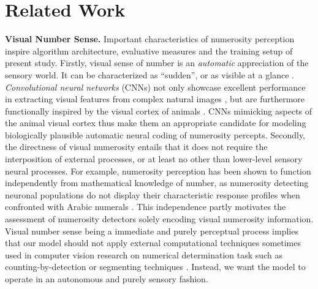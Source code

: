 \documentclass[twocolumn]{article}
\begin{document}
\hypertarget{related-work}{%
\section{Related Work}\label{related-work}}

\newcommand{\relatedss}[2]{{\bfseries #1. }{#2}}

\relatedss{Visual Number Sense}{Important characteristics of numerosity perception inspire algorithm architecture, evaluative measures and the  training setup of present study. Firstly, visual sense of number is an \emph{automatic} appreciation of the sensory world. It can be characterized as ``sudden'', or as visible at a glance \citetext{\citealp[p.~57]{dehaene2011number}; \citealp{zhang2016salient}}. \emph{Convolutional neural networks} (CNNs) not only showcase excellent performance in extracting visual features from complex natural images \citetext{\citealp{GoogleDeepMind}; \citealp{krizhevsky2012imagenet}; \citealp[for visual number sense and CNNs see][]{zhang2016salient}}, but are furthermore functionally inspired by the visual cortex of animals \citep[specifically cats, see][]{lecun1995convolutional}. CNNs mimicking aspects of the animal visual cortex thus make them an appropriate candidate for modeling biologically plausible automatic neural coding of numerosity percepts. 
Secondly, the directness of visual numerosity entails that it does not require the interposition of external processes, or at least no other than lower-level sensory neural processes. For example, numerosity perception has been shown to function independently from mathematical knowledge of number, as numerosity detecting neuronal populations do not display their characteristic response profiles when confronted with Arabic numerals \citep{harvey2013topographic, poncet2016individuation}. This independence partly motivates the assessment of numerosity detectors solely encoding visual numerosity information. Visual number sense being a immediate and purely perceptual process implies that our model should not apply external computational techniques sometimes used in computer vision research on numerical determination task such as counting-by-detection \citep[which requires both arithmetic and iterative attention to all group members, see][]{zhang2016salient, detection2016unconstrained} or segmenting techniques \citep[e.g.][]{chattopadhyay2016counting}. Instead, we want the model to operate in an autonomous and purely sensory fashion.}
\end{document}
